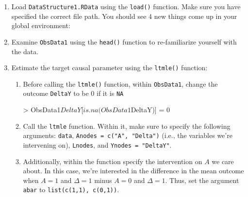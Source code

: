 \documentclass{exam}
\newenvironment{packed_item}{
\begin{itemize}
 \setlength{\itemsep}{0pt}
  \setlength{\parskip}{0pt}
  \setlength{\parsep}{0pt}
}{\end{itemize}}
\begin{document}
\begin{enumerate}
\item Load \texttt{DataStructure1.RData} using the \texttt{load()} function. Make sure you have specified the correct file path. You should see 4 new things come up in your global environment:
\item Examine \texttt{ObsData1} using the \texttt{head()} function to re-familiarize yourself with the data.
\item Estimate the target causal parameter using the \texttt{ltmle()} function:
\begin{enumerate}
\item Before calling the \texttt{ltmle()} function, within \texttt{ObsData1}, change the outcome \texttt{DeltaY} to be 0 if it is \texttt{NA}
\begin{Schunk}
\begin{Sinput}
> ObsData1$DeltaY[is.na(ObsData1$DeltaY)] = 0
\end{Sinput}
\end{Schunk}
\item Call the \texttt{ltmle} function. Within it, make sure to specify the following arguments: \texttt{data}, \texttt{Anodes = c("A", "Delta")} (i.e., the variables we're intervening on), \texttt{Lnodes}, and \texttt{Ynodes = "DeltaY"}.
\item Additionally, within the function specify the intervention on $A$ we care about. In this case, we're interested in the difference in the mean outcome when $A=1$ and $\Delta=1$ minus $A=0$ and $\Delta = 1$. Thus, set the argument \texttt{abar} to \texttt{list(c(1,1), c(0,1))}.

\end{enumerate}
\end{enumerate}
\end{document}
